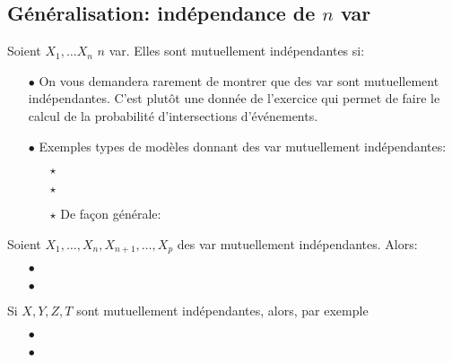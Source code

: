 \documentclass[a4paper, 11pt]{article}
\begin{document}
\subsection{G\'en\'eralisation: ind\'ependance de $n$ var}


\begin{defi} 
Soient $X_1,\dots X_n$ $n$ var. Elles sont mutuellement ind\'ependantes si:\\
\vspace{1.2cm}
\end{defi}
 

\begin{rems}
\begin{itemize}
\item[$\bullet$] On vous demandera rarement de montrer que des var sont mutuellement ind\'ependantes. C'est plut\^ot une donn\'ee de l'exercice qui permet de faire le calcul de la probabilit\'e d'intersections d'\'ev\'enements.

\item[$\bullet$] Exemples types de mod\`{e}les donnant des var mutuellement ind\'ependantes:\vsec
\begin{itemize}
\item[$\star$] \dotfill\vsec
\item[$\star$] \dotfill\vsec
\item[$\star$] De fa\c{c}on g\'en\'erale: \dotfill\vsec
\end{itemize}
\end{itemize}
\end{rems}


\begin{prop} 
Soient $X_1,\dots, X_n,X_{n+1},\dots, X_p$ des var mutuellement ind\'ependantes. Alors:\vsec
\begin{itemize}
\item[$\bullet$] \dotfill\vsec
\item[$\bullet$] \dotfill\vsec
\end{itemize}
\end{prop}


\begin{exemples}
Si $X,Y,Z,T$ sont mutuellement ind\'ependantes, alors, par exemple\vsec
\begin{itemize}
 \item[$\bullet$] \dotfill\vsec
\item[$\bullet$] \dotfill\vsec
\end{itemize}
\end{exemples}






\end{document}
